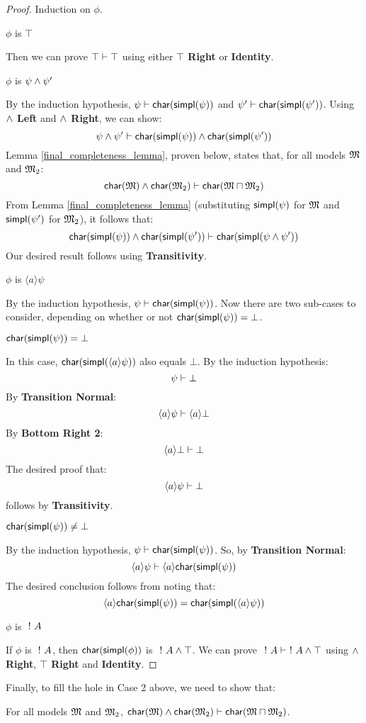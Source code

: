 \begin{proof}
Induction on $\phi$.

\setcounter{mycase}{0}

\begin{mycase}
$\phi$ is $\top$
\end{mycase}
Then we can prove  $\top \vdash \top$ using either {\bf $\top$ Right} or {\bf Identity}.

\begin{mycase}
$\phi$ is $\psi \land \psi'$
\end{mycase}
By the induction hypothesis, $\psi \vdash  \mathsf{char}(\mathsf{simpl}(\psi))$ and $\psi' \vdash  \mathsf{char}(\mathsf{simpl}(\psi'))$.
Using {\bf $\land$ Left} and {\bf $\land$ Right}, we can show:
\[
\psi \land \psi' \vdash  \mathsf{char}(\mathsf{simpl}(\psi)) \land  \mathsf{char}(\mathsf{simpl}(\psi'))
\]
Lemma \ref{final_completeness_lemma}, proven below, states that, for all models $\frak{M}$ and $\frak{M}_2$:
\[
  \mathsf{char}(\frak{M}) \land  \mathsf{char}(\frak{M}_2) \vdash  \mathsf{char}(\frak{M} \sqcap \frak{M}_2)
\]
From Lemma \ref{final_completeness_lemma} (substituting $\mathsf{simpl}(\psi)$ for $\frak{M}$ and $\mathsf{simpl}(\psi')$ for $\frak{M}_2$), it follows that:
\[
 \mathsf{char}(\mathsf{simpl}(\psi)) \land  \mathsf{char}(\mathsf{simpl}(\psi')) \vdash  \mathsf{char}(\mathsf{simpl}(\psi \land \psi'))
\]
Our desired result follows using {\bf Transitivity}.

\begin{mycase}
$\phi$ is $\langle a \rangle \psi$
\end{mycase}
By the induction hypothesis, $\psi \vdash  \mathsf{char}(\mathsf{simpl}(\psi))$.
Now there are two sub-cases to consider, depending on whether or not $ \mathsf{char}(\mathsf{simpl}(\psi)) = \bot$.
\begin{subcase}
$ \mathsf{char}(\mathsf{simpl}(\psi)) = \bot$
\end{subcase}
In this case, $ \mathsf{char}(\mathsf{simpl}(\langle a \rangle \psi))$ also equals $\bot$. 
By the induction hypothesis:
\[
\psi \vdash \bot
\]
By {\bf Transition Normal}:
\[
\langle a \rangle \psi \vdash \langle a \rangle \bot
\]
By {\bf Bottom Right 2}:
\[
\langle a \rangle \bot \vdash \bot
\]
The desired proof that:
\[
\langle a \rangle \psi \vdash \bot
\]
follows by {\bf Transitivity}.
\begin{subcase}
$ \mathsf{char}(\mathsf{simpl}(\psi)) \neq \bot$
\end{subcase}
By the induction hypothesis, $\psi \vdash  \mathsf{char}(\mathsf{simpl}(\psi))$.
So, by {\bf Transition Normal}:
\[
\langle a \rangle \psi \vdash \langle a \rangle  \mathsf{char}(\mathsf{simpl}(\psi))
\]
The desired conclusion follows from noting that:
\[
 \langle a \rangle  \mathsf{char}(\mathsf{simpl}(\psi)) =  \mathsf{char}(\mathsf{simpl}(\langle a \rangle \psi))
 \]
 \begin{mycase}
$\phi$ is $\ ! \  A$
\end{mycase}
If $\phi$ is $\ ! \  A$, then $  \mathsf{char}(\mathsf{simpl}(\phi))$ is $\ ! \  A \land \top$.
We can prove $\ ! \  A \vdash \ ! \  A \land \top$ using {\bf $\land$ Right}, {\bf $\top$ Right} and {\bf Identity}.

\end{proof}
Finally, to fill the hole in Case 2 above, we need to show that:
\begin{lemma}
\label{final_completeness_lemma}
For all models $\frak{M}$ and $\frak{M}_2$, $  \mathsf{char}(\frak{M}) \land  \mathsf{char}(\frak{M}_2) \vdash  \mathsf{char}(\frak{M} \sqcap \frak{M}_2)$.
\end{lemma}

